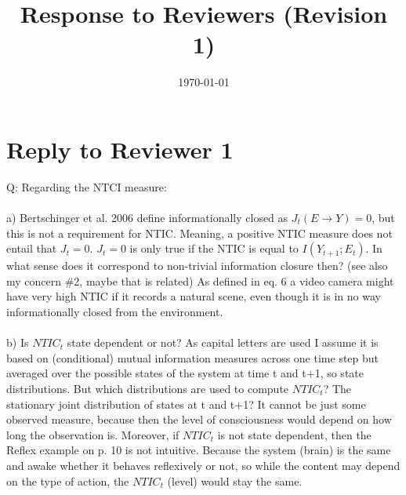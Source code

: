 \documentclass[utf8]{article}
\title{Response to Reviewers (Revision 1)}
\date{\today}
\author{}
\newcounter{cQuestion}[section]
\newenvironment{question}
    {\refstepcounter{cQuestion}\color{Blue}\noindent\newline Q\thecQuestion:}
    {~\newline}
\begin{document}
    \maketitle

    \section{Reply to Reviewer 1}
        \begin{question}
            Regarding the NTCI measure: \\\\
            a) Bertschinger et al. 2006 define informationally closed as $J_t(E\rightarrow Y) = 0$, but this is not a requirement for NTIC. Meaning, a positive NTIC measure does not entail that $J_t = 0$. $J_t = 0$ is only true if the NTIC is equal to $I(Y_{t+1}; E_t)$. In what sense does it correspond to non-trivial information closure then? (see also my concern \#2, maybe that is related) As defined in eq. 6 a video camera might have very high NTIC if it records a natural scene, even though it is in no way informationally closed from the environment.\\\\
            b) Is $NTIC_t$ state dependent or not? As capital letters are used I assume it is based on (conditional) mutual information measures across one time step but averaged over the possible states of the system at time t and t+1, so state distributions. But which distributions are used to compute $NTIC_t$? The stationary joint distribution of states at t and t+1? It cannot be just some observed measure, because then the level of consciousness would depend on how long the observation is. Moreover, if $NTIC_t$ is not state dependent, then the Reflex example on p. 10 is not intuitive. Because the system (brain) is the same and awake whether it behaves reflexively or not, so while the content may depend on the type of action, the $NTIC_t$ (level) would stay the same.              
        \end{question}
    
\end{document}
